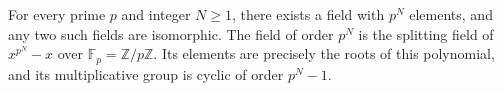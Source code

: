For every prime $p$ and integer $N \geq 1$, there exists a field with $p^N$ elements, and any two such fields are isomorphic. The field of order $p^N$ is the splitting field of $x^{p^N} - x$ over $\mathbb{F}_p = \mathbb{Z}/p\mathbb{Z}$. Its elements are precisely the roots of this polynomial, and its multiplicative group is cyclic of order $p^N - 1$.
